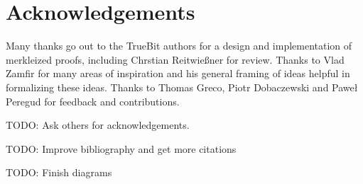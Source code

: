 \documentclass[letterpaper, 11pt]{article}
\begin{document}
\section{Acknowledgements}

Many thanks go out to the TrueBit authors for a design and implementation of
merkleized proofs, including Chrstian Reitwie{\ss}ner for review. Thanks to
Vlad Zamfir for many areas of inspiration and his general framing of ideas
helpful in formalizing these ideas. Thanks to Thomas Greco, Piotr Dobaczewski
and Pawe\l{} Peregud
for feedback and contributions.

TODO: Ask others for acknowledgements.

TODO: Improve bibliography and get more citations

TODO: Finish diagrams




%



\end{document}

